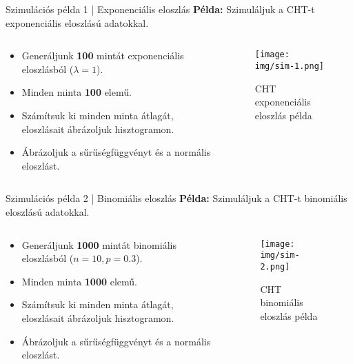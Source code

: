 \documentclass[aspectratio=169,12pt]{beamer}
\begin{document}
	\begin{frame}{Szimulációs példa 1 | Exponenciális eloszlás}
		\textbf{Példa:} Szimuláljuk a CHT-t exponenciális eloszlású adatokkal.
		\begin{columns}
			\begin{column}{0.5\textwidth}
				\begin{itemize}
					\item Generáljunk \textbf{100} mintát exponenciális eloszlásból (\(\lambda = 1\)).
					\item Minden minta \textbf{100} elemű.
					\item Számítsuk ki minden minta átlagát, eloszlásait ábrázoljuk hisztogramon.
					\item Ábrázoljuk a sűrűségfüggvényt és a normális eloszlást.
				\end{itemize}
			\end{column}
			\begin{column}{0.5\textwidth}
				\begin{figure}
					\texttt{[image: img/sim-1.png]}
					\caption{CHT exponenciális eloszlás példa}
				\end{figure}
			\end{column}
		\end{columns}
	\end{frame}
	
	\begin{frame}{Szimulációs példa 2 | Binomiális eloszlás}
		\textbf{Példa:} Szimuláljuk a CHT-t binomiális eloszlású adatokkal.
		\begin{columns}
			\begin{column}{0.5\textwidth}
				\begin{itemize}
					\item Generáljunk \textbf{1000} mintát binomiális eloszlásból (\(n=10, p=0.3\)).
					\item Minden minta \textbf{1000} elemű.
					\item Számítsuk ki minden minta átlagát, eloszlásait ábrázoljuk hisztogramon.
					\item Ábrázoljuk a sűrűségfüggvényt és a normális eloszlást.
				\end{itemize}
			\end{column}
			\begin{column}{0.5\textwidth}
				\begin{figure}
					\texttt{[image: img/sim-2.png]}
					\caption{CHT binomiális eloszlás példa}
				\end{figure}
			\end{column}
		\end{columns}
	\end{frame}
	
\end{document}
